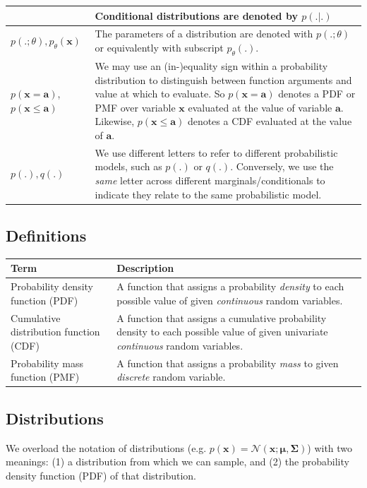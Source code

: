 \documentclass[MAL,biber]{nowfnt} %
\newcommand{\bb}[1]{\mathbf{#1}}
\newcommand{\ba}{\bb{a}}
\newcommand{\bx}{\bb{x}}
\newcommand{\bmu}{\boldsymbol{\mu}}
\begin{document}
\begin{longtable}{| p{2.5cm} | p{8cm} |}
	&
	Conditional distributions are denoted by $p(.|.)$
	\\ \hline
	$p(.;\theta), p_\theta(\bx)$
	&
	The parameters of a distribution are denoted with $p(.;\theta)$ or equivalently with subscript $p_\theta(.)$.
	\\ \hline
	$p(\bx = \ba)$, $p(\bx \leq \ba)$
	&
	We may use an (in-)equality sign within a probability distribution to distinguish between function arguments and value at which to evaluate. So $p(\bx = \ba)$ denotes a PDF or PMF over variable $\bx$ evaluated at the value of variable $\ba$. Likewise, $p(\bx \leq \ba)$ denotes a CDF evaluated at the value of $\ba$.
	\\ \hline
	$p(.), q(.)$
	&
	We use different letters to refer to different probabilistic models, such as $p(.)$ or $q(.)$. Conversely, we use the \emph{same} letter across different marginals/conditionals to indicate they relate to the same probabilistic model.
	\\ \hline
\end{longtable}
\egroup

\subsection{Definitions}
\bgroup
\def\arraystretch{1.5}%
\begin{longtable}{| p{2.5cm} | p{8cm} |}
	\hline 
	\textbf{Term} & \textbf{Description}\\
	\hline \hline
	Probability density function (PDF) & A function that assigns a probability \emph{density} to each possible value of given \emph{continuous} random variables.
	\\ \hline
	Cumulative distribution function (CDF) & A function that assigns a cumulative probability density to each possible value of given univariate \emph{continuous} random variables.
	\\ \hline
	Probability mass function (PMF) & A function that assigns a probability \emph{mass} to given \emph{discrete} random variable.
	\\ \hline
\end{longtable}
\egroup

\subsection{Distributions}

We overload the notation of distributions (e.g. $p(\bx) = \mathcal{N}(\bx; \bmu, \boldsymbol{\Sigma})$) with two meanings: (1) a distribution from which we can sample, and (2) the probability density function (PDF) of that distribution.
\end{document}
